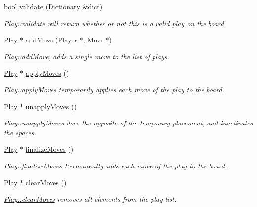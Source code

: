 \begin{DoxyCompactItemize}
bool \hyperlink{class_play_a498e6c1b124296872e22151e8ee965fb}{validate} (\hyperlink{class_dictionary}{Dictionary} \&dict)
\begin{DoxyCompactList}\small\item\em \hyperlink{class_play_a498e6c1b124296872e22151e8ee965fb}{Play\-::validate} will return whether or not this is a valid play on the board. \end{DoxyCompactList}\item 
\hyperlink{class_play}{Play} $\ast$ \hyperlink{class_play_ad70d9b77395e7b30506d1c38ace45bf0}{add\-Move} (\hyperlink{class_player}{Player} $\ast$, \hyperlink{class_move}{Move} $\ast$)
\begin{DoxyCompactList}\small\item\em \hyperlink{class_play_ad70d9b77395e7b30506d1c38ace45bf0}{Play\-::add\-Move}, adds a single move to the list of plays. \end{DoxyCompactList}\item 
\hyperlink{class_play}{Play} $\ast$ \hyperlink{class_play_a5b6d4e2fafc15310485d4770ae36e46e}{apply\-Moves} ()
\begin{DoxyCompactList}\small\item\em \hyperlink{class_play_a5b6d4e2fafc15310485d4770ae36e46e}{Play\-::apply\-Moves} temporarily applies each move of the play to the board. \end{DoxyCompactList}\item 
\hyperlink{class_play}{Play} $\ast$ \hyperlink{class_play_a56788c5adf1bdc5230bf226f6a97dd04}{unapply\-Moves} ()
\begin{DoxyCompactList}\small\item\em \hyperlink{class_play_a56788c5adf1bdc5230bf226f6a97dd04}{Play\-::unapply\-Moves} does the opposite of the temporary placement, and inactivates the spaces. \end{DoxyCompactList}\item 
\hyperlink{class_play}{Play} $\ast$ \hyperlink{class_play_a02fbcafed804466c41fd78e8eef8ca16}{finalize\-Moves} ()
\begin{DoxyCompactList}\small\item\em \hyperlink{class_play_a02fbcafed804466c41fd78e8eef8ca16}{Play\-::finalize\-Moves} Permanently adds each move of the play to the board. \end{DoxyCompactList}\item 
\hyperlink{class_play}{Play} $\ast$ \hyperlink{class_play_af9f4b1daff13026dd4f38f93375f576f}{clear\-Moves} ()
\begin{DoxyCompactList}\small\item\em \hyperlink{class_play_af9f4b1daff13026dd4f38f93375f576f}{Play\-::clear\-Moves} removes all elements from the play list. \end{DoxyCompactList}\item 

\end{DoxyCompactItemize}
